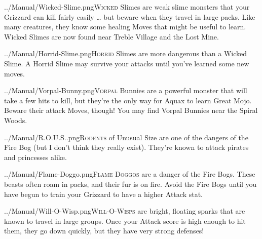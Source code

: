 \documentclass[10pt,twocolumn,openany,article]{memoir}
\begin{document}
\begin{description}
\lettrine[image=true,                lines=5,               findent=3pt,
nindent=3pt]{../Manual/Wicked-Slime.png}{Wicked}  Slimes are  weak slime
monsters that  your Grizzard can  kill fairly  easily … but  beware when
they travel in large packs. Like  many creatures, they know some healing
Moves that  might be useful to  learn. Wicked Slimes are  now found near
Treble Village and the Lost Mine.

\vspace{14pt}

\lettrine[image=true,                lines=5,               findent=3pt,
nindent=3pt]{../Manual/Horrid-Slime.png}{Horrid}    Slimes   are    more
dangerous than a  Wicked Slime. A Horrid Slime may  survive your attacks
until you've learned some new moves.

\vspace{14pt}

\lettrine[image=true,               lines=5,               findent=3pt,
nindent=3pt]{../Manual/Vorpal-Bunny.png}{Vorpal} Bunnies  are a powerful
monster that will take a few hits  to kill, but they're the only way for
Aquax to  learn Great Mojo. Beware  their attack Moves, though!  You may
find Vorpal Bunnies near the Spiral Woods.

\vspace{14pt}

\lettrine[image=true,                lines=5,               findent=3pt,
nindent=3pt]{../Manual/R.O.U.S..png}{Rodents} of Unusual Size are one of
the  dangers of  the Fire  Bog (but  I don't  think they  really exist).
They're known to attack pirates and princesses alike.

\vspace{14pt}

\lettrine[image=true,                lines=5,               findent=3pt,
nindent=3pt]{../Manual/Flame-Doggo.png}{Flame  Doggos} are  a danger  of
the Fire  Bogs. These beasts  often roam in packs,  and their fur  is on
fire. Avoid the Fire Bogs until you have begun to train your Grizzard to
have a higher Attack stat.

\vspace{14pt}

\lettrine[image=true,                lines=5,               findent=3pt,
nindent=3pt]{../Manual/Will-O-Wisp.png}{Will-O-Wisps}     are    bright,
floating sparks  that are  known to  travel in  large groups.  Once your
Attack score is high enough to hit  them, they go down quickly, but they
have very strong defenses!


\end{description}
\end{document}
